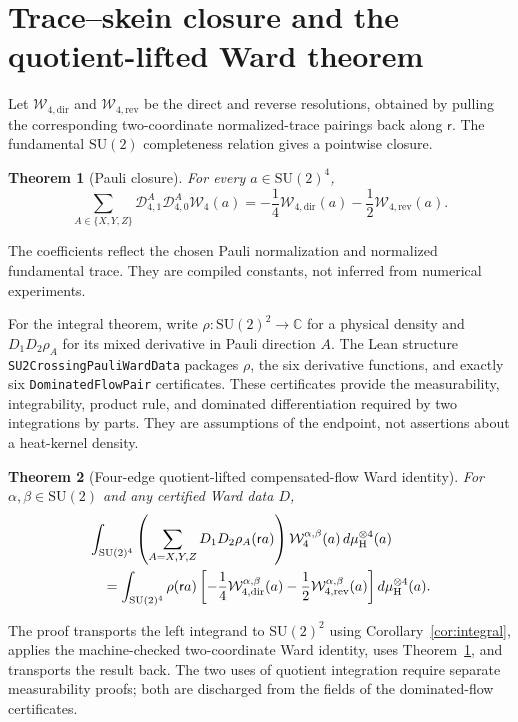 \documentclass[11pt]{article}
\newtheorem{theorem}{Theorem}[section]
\theoremstyle{definition}
\newcommand{\SU}{\mathrm{SU}(2)}
\newcommand{\C}{\mathbb C}
\newcommand{\Haar}{\mu_{\mathrm H}}
\newcommand{\red}{\mathsf r}
\newcommand{\W}{\mathcal W}
\newcommand{\D}{\mathcal D}
\newcommand{\dir}{\mathrm{dir}}
\newcommand{\rev}{\mathrm{rev}}
\begin{document}
\section{Trace--skein closure and the quotient-lifted Ward theorem}

Let $\W_{4,\dir}$ and $\W_{4,\rev}$ be the direct and reverse resolutions,
obtained by pulling the corresponding two-coordinate normalized-trace
pairings back along $\red$.  The fundamental $\SU$ completeness relation
gives a pointwise closure.

\begin{theorem}[Pauli closure]\label{thm:closure}
For every $a\in\SU^4$,
\begin{equation}\label{eq:closure}
 \sum_{A\in\{X,Y,Z\}}\D_{4,1}^{A}\D_{4,0}^{A}\W_4(a)
 =-\frac14\W_{4,\dir}(a)-\frac12\W_{4,\rev}(a).
\end{equation}
\end{theorem}

The coefficients reflect the chosen Pauli normalization and normalized
fundamental trace.  They are compiled constants, not inferred from numerical
experiments.

For the integral theorem, write $\rho:\SU^2\to\C$ for a physical density and
$D_1D_2\rho_A$ for its mixed derivative in Pauli direction $A$.  The Lean
structure \texttt{SU2CrossingPauliWardData} packages $\rho$, the six derivative
functions, and exactly six \texttt{DominatedFlowPair} certificates.  These
certificates provide the measurability, integrability, product rule, and
dominated differentiation required by two integrations by parts.  They are
assumptions of the endpoint, not assertions about a heat-kernel density.

\begin{theorem}[Four-edge quotient-lifted compensated-flow Ward identity]
\label{thm:ward}
For $\alpha,\beta\in\SU$ and any certified Ward data $D$,
\begin{align}
 &\int_{\SU^4}\left(\sum_{A=X,Y,Z}D_1D_2\rho_A(\red a)\right)
       \W_4^{\alpha,\beta}(a)\,d\Haar^{\otimes4}(a) \notag\\
 &\quad=\int_{\SU^4}\rho(\red a)
   \left[-\frac14\W_{4,\dir}^{\alpha,\beta}(a)
         -\frac12\W_{4,\rev}^{\alpha,\beta}(a)\right]
       d\Haar^{\otimes4}(a).\label{eq:ward4}
\end{align}
\end{theorem}

The proof transports the left integrand to $\SU^2$ using
Corollary~\ref{cor:integral}, applies the machine-checked two-coordinate Ward
identity, uses Theorem~\ref{thm:closure}, and transports the result back.  The
two uses of quotient integration require separate measurability proofs; both
are discharged from the fields of the dominated-flow certificates.
\end{document}
